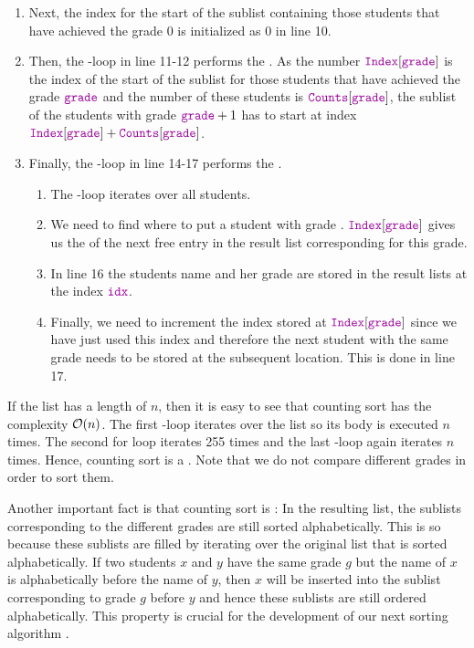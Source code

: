 \begin{enumerate}
\item Next, the index for the start of the sublist containing those students that have achieved the grade $0$
      is initialized as $0$ in line 10. 
\item Then, the -loop in line 11-12 performs the . As the number
      $\mytt{Index}[\mytt{grade}]$ is the index of the start of the sublist for those students that have
      achieved the grade  $\mytt{grade}$ and the number of these
      students is $\mytt{Counts}[\mytt{grade}]$, the sublist of the students with grade $\mytt{grade}+1$
      has to start at index 
      \\[0.2cm]
      \hspace*{1.3cm}
      $\mytt{Index}[\mytt{grade}] + \mytt{Counts}[\mytt{grade}]$.
\item Finally, the -loop in line 14-17 performs the .
      \begin{enumerate}
      \item The -loop iterates over all students. 
      \item We need to find where to put a student with grade .
            $\mytt{Index}[\mytt{grade}]$ gives us the  of the next free entry in the
            result list  corresponding for this grade.
      \item In line 16 the students name and her grade are stored in the result lists 
            at the index $\mytt{idx}$.
      \item Finally, we need to increment the index stored at $\mytt{Index}[\mytt{grade}]$ since we have
            just used this index and therefore the next student with the same grade needs to be
            stored at the subsequent location.  This is done in line 17.
      \end{enumerate}
\end{enumerate}
If the list  has a length of $n$, then it is easy to
see that counting sort has the complexity $\mathcal{O}(n)$.  The first -loop iterates over the list  so
its body is executed $n$ times.  The second for loop iterates 255 times and the last -loop again
iterates $n$ times.  Hence, counting sort is a .  Note that we do not compare different grades in
order to sort them.

Another important fact is that counting sort is : In the resulting list, the sublists
corresponding to the different grades are still sorted alphabetically.  This is so because these sublists are
filled by iterating over the original list that is sorted alphabetically.  If two students $x$ and $y$ have the
same grade $g$ but the name of $x$ is alphabetically before the name of $y$, then $x$ will be inserted into the
sublist corresponding to grade $g$ before $y$ and hence these sublists are still ordered alphabetically.  This property
is crucial for the development of our next sorting algorithm .


